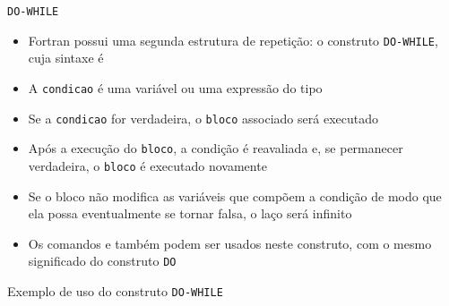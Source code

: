 \begin{frame}[fragile]{\tt DO-WHILE}

    \begin{itemize}
        \item Fortran possui uma segunda estrutura de repetição: o construto \texttt{DO-WHILE},
            cuja sintaxe é


        \item A \texttt{condicao} é uma variável ou uma expressão do tipo 

        \item Se a \texttt{condicao} for verdadeira, o \texttt{bloco} associado será executado

        \item Após a execução do \texttt{bloco}, a condição é reavaliada e, se permanecer
            verdadeira, o \texttt{bloco} é executado novamente

        \item Se o bloco não modifica as variáveis que compõem a condição de modo que ela possa
            eventualmente se tornar falsa, o laço será infinito

        \item Os comandos  e  também podem ser usados
            neste construto, com o mesmo significado do construto \texttt{DO}
    \end{itemize}

\end{frame}

\begin{frame}[fragile]{Exemplo de uso do construto {\tt DO-WHILE}}
\end{frame}


